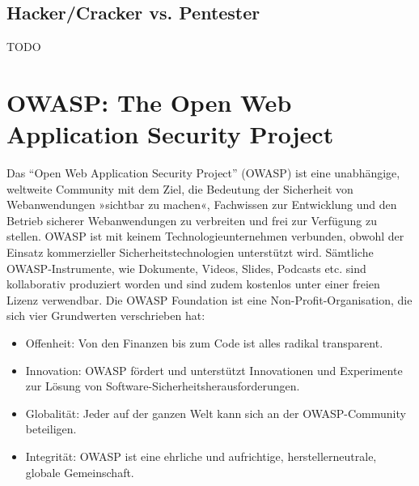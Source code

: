 \documentclass[12pt,oneside,a4paper,parskip]{scrbook}
\begin{document}
    \subsection{Hacker/Cracker vs. Pentester}
    TODO

  \section{OWASP: The Open Web Application Security Project}
  Das ``Open Web Application Security Project'' (OWASP) ist eine unabhängige, weltweite Community mit dem Ziel, die Bedeutung der Sicherheit von Webanwendungen »sichtbar zu machen«, Fachwissen zur Entwicklung und den Betrieb sicherer Webanwendungen zu verbreiten und frei zur Verfügung zu stellen.
  OWASP ist mit keinem Technologieunternehmen verbunden, obwohl der Einsatz kommerzieller Sicherheitstechnologien unterstützt wird. Sämtliche OWASP-Instrumente, wie Dokumente, Videos, Slides, Podcasts etc. sind kollaborativ produziert worden und sind zudem kostenlos unter einer freien Lizenz verwendbar. Die OWASP Foundation ist eine Non-Profit-Organisation, die sich vier Grundwerten verschrieben hat:

  \begin{itemize}
    \item Offenheit: Von den Finanzen bis zum Code ist alles radikal transparent.
    \item Innovation: OWASP fördert und unterstützt Innovationen und Experimente zur Lösung von Software-Sicherheitsherausforderungen.
    \item Globalität: Jeder auf der ganzen Welt kann sich an der OWASP-Community beteiligen.
    \item Integrität: OWASP ist eine ehrliche und aufrichtige, herstellerneutrale, globale Gemeinschaft.
  \end{itemize}
\end{document}
